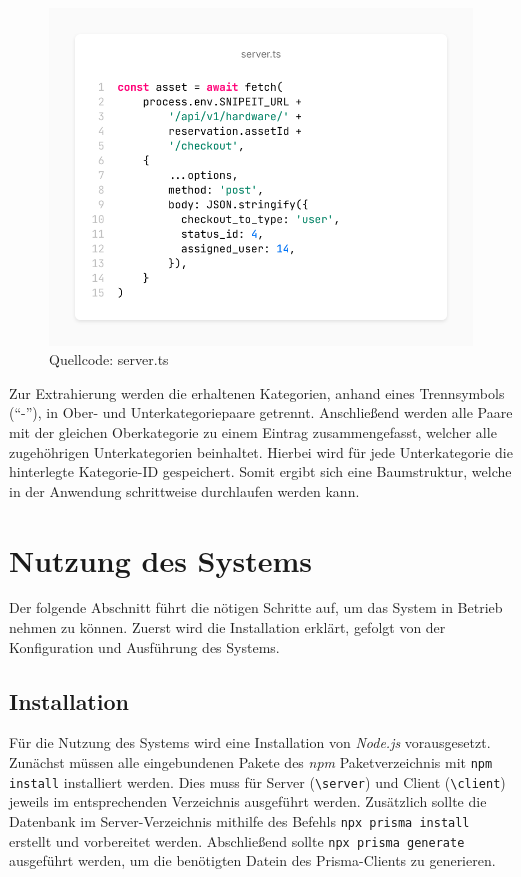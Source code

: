 \begin{figure}[h]
  \centering
  \includegraphics[scale=0.4]{Bilder/screenshot(5).png}
  \caption[Quellcode: server.ts]{Quellcode: server.ts}
  \label{fig:categoriecode}
\end{figure}

Zur Extrahierung werden die erhaltenen Kategorien, anhand eines Trennsymbols (\enquote{-}), in Ober- und
Unterkategoriepaare getrennt. Anschließend werden alle Paare mit der gleichen Oberkategorie zu einem
Eintrag zusammengefasst, welcher alle zugehöhrigen Unterkategorien beinhaltet. Hierbei wird für jede
Unterkategorie die hinterlegte Kategorie-ID gespeichert. Somit ergibt sich eine Baumstruktur, welche
in der Anwendung schrittweise durchlaufen werden kann.


\section{Nutzung des Systems}
\label{subsec:nutzung}
Der folgende Abschnitt führt die nötigen Schritte auf, um das System in Betrieb nehmen zu können.
Zuerst wird die Installation erklärt, gefolgt von der Konfiguration und Ausführung des Systems.

\subsection{Installation}
Für die Nutzung des Systems wird eine Installation von \textit{Node.js} vorausgesetzt. Zunächst
müssen alle eingebundenen Pakete des \textit{npm} Paketverzeichnis mit \lstinline{npm install}
installiert werden. Dies muss für Server (\lstinline{\server}) und Client (\lstinline{\client})
jeweils im entsprechenden Verzeichnis ausgeführt werden. Zusätzlich sollte die Datenbank im
Server-Verzeichnis mithilfe des Befehls \lstinline{npx prisma install }
erstellt und vorbereitet werden. Abschließend sollte \lstinline{npx prisma generate} ausgeführt
werden, um die benötigten Datein des Prisma-Clients zu generieren.

